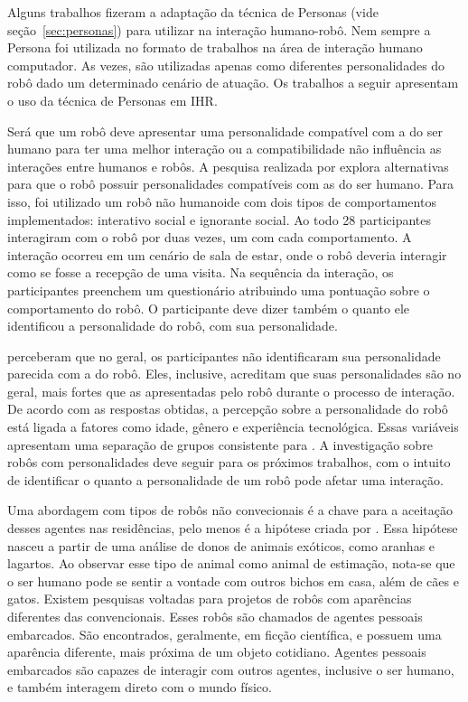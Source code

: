 Alguns trabalhos fizeram a adaptação da técnica de Personas (vide seção~\ref{sec:personas}) para utilizar na interação humano-robô. Nem sempre a Persona foi utilizada no formato de trabalhos na área de interação humano computador. As vezes, são utilizadas apenas como diferentes personalidades do robô dado um determinado cenário de atuação. Os trabalhos a seguir apresentam o uso da técnica de Personas em IHR.

Será que um robô deve apresentar uma personalidade compatível com a do ser humano para ter uma melhor interação ou a compatibilidade não influência as interações entre humanos e robôs. A pesquisa realizada por \textcite{woods:2005} explora alternativas para que o robô possuir personalidades compatíveis com as do ser humano. Para isso, foi utilizado um robô não humanoide com dois tipos de comportamentos implementados: interativo social e ignorante social. Ao todo 28 participantes interagiram com o robô por duas vezes, um com cada comportamento. A interação ocorreu em um cenário de sala de estar, onde o robô deveria interagir como se fosse a recepção de uma visita. Na sequência da interação, os participantes preenchem um questionário atribuindo uma pontuação sobre o comportamento do robô. O participante deve dizer também o quanto ele identificou a personalidade do robô, com sua personalidade.

\textcite{woods:2005} perceberam que no geral, os participantes não identificaram sua personalidade parecida com a do robô. Eles, inclusive, acreditam que suas personalidades são no geral, mais fortes que as apresentadas pelo robô durante o processo de interação. De acordo com as respostas obtidas, a percepção sobre a personalidade do robô está ligada a fatores como idade, gênero e experiência tecnológica. Essas variáveis apresentam uma separação de grupos consistente para \textcite{woods:2005}. A investigação sobre robôs com personalidades deve seguir para os próximos trabalhos, com o intuito de identificar o quanto a personalidade de um robô pode afetar uma interação.

Uma abordagem com tipos de robôs não convecionais é a chave para a aceitação desses agentes nas residências, pelo menos é a hipótese criada por \textcite{ljungblad:2006}. Essa hipótese nasceu a partir de uma análise de donos de animais exóticos, como aranhas e lagartos. Ao observar esse tipo de animal como animal de estimação, nota-se que o ser humano pode se sentir a vontade com outros bichos em casa, além de cães e gatos. Existem pesquisas voltadas para projetos de robôs com aparências diferentes das convencionais. Esses robôs são chamados de agentes pessoais embarcados. São encontrados, geralmente, em ficção científica, e possuem uma aparência diferente, mais próxima de um objeto cotidiano. Agentes pessoais embarcados são capazes de interagir com outros agentes, inclusive o ser humano, e também interagem direto com o mundo físico.

